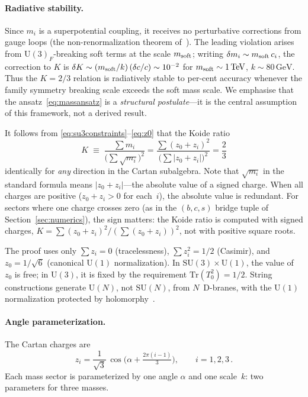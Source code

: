 \documentclass[12pt,a4paper]{article}
\newcommand{\SU}{\mathrm{SU}}
\newcommand{\UU}{\mathrm{U}}
\newcommand{\Tr}{\mathrm{Tr}}
\newcommand{\GeV}{\,\mathrm{GeV}}
\newcommand{\TeV}{\,\mathrm{TeV}}
\begin{document}
\paragraph{Radiative stability.}
Since $m_i$ is a superpotential coupling, it receives no
perturbative corrections from gauge loops (the non-renormalization
theorem of~\cite{Seiberg:1993vc}). The leading violation arises
from $\UU(3)_F$-breaking soft terms at the scale $m_{\rm soft}$;
writing $\delta m_i \sim m_{\rm soft}\,c_i$, the correction to $K$
is $\delta K \sim (m_{\rm soft}/k)\,(\delta c/c) \sim 10^{-2}$
for $m_{\rm soft} \sim 1\TeV$, $k \sim 80\GeV$.
Thus the $K=2/3$ relation is radiatively stable to per-cent accuracy
whenever the family symmetry breaking scale exceeds the soft mass scale.
We emphasise that the ansatz~\eqref{eq:massansatz} is a
\emph{structural postulate}---it is the central assumption
of this framework, not a derived result.

It follows from
\eqref{eq:su3constraints}--\eqref{eq:z0} that the Koide ratio
\begin{equation}
  K \;\equiv\; \frac{\sum m_i}{\bigl(\sum\sqrt{m_i}\bigr)^2}
  = \frac{\sum (z_0{+}z_i)^2}{\bigl(\sum |z_0{+}z_i|\bigr)^2}
  = \frac{2}{3}
  \label{eq:K23}
\end{equation}
identically for \emph{any} direction in the Cartan subalgebra.
Note that $\sqrt{m_i}$ in the standard formula means
$|z_0 + z_i|$---the absolute value of a signed charge. When all
charges are positive ($z_0 + z_i > 0$ for each~$i$), the
absolute value is redundant.
For sectors where one charge crosses zero (as in the $(b,c,s)$
bridge tuple of Section~\ref{sec:numerics}), the sign matters:
the Koide ratio is computed with signed charges,
$K = \sum(z_0{+}z_i)^2/(\sum(z_0{+}z_i))^2$, not with positive
square roots.

The proof uses only $\sum z_i = 0$ (tracelessness), $\sum z_i^2 = 1/2$
(Casimir), and $z_0 = 1/\sqrt{6}$ (canonical $\UU(1)$ normalization).
In $\SU(3) \times \UU(1)$, the value of $z_0$ is free; in $\UU(3)$, it
is fixed by the requirement $\Tr(T_0^2) = 1/2$. String constructions
generate $\UU(N)$, not $\SU(N)$, from $N$~D-branes, with the
$\UU(1)$ normalization protected by
holomorphy~\cite{Polchinski:1998rr}.

\paragraph{Angle parameterization.}
The Cartan charges are
\begin{equation}
  z_i = \frac{1}{\sqrt{3}}\,\cos\!\bigl(\alpha + \tfrac{2\pi (i-1)}{3}\bigr),
  \qquad i = 1,2,3\,.
  \label{eq:zi}
\end{equation}
Each mass sector is parameterized by one angle $\alpha$ and one
scale~$k$: two parameters for three masses.
\end{document}
